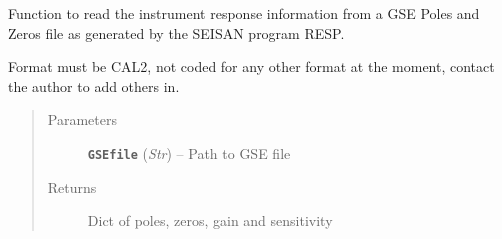 \documentclass[a4paper,10pt,english]{sphinxmanual}
\begin{document}

\begin{fulllineitems}
\label{submodules/utils.mag_calc:mag_calc._GSE2_PAZ_read}
Function to read the instrument response information from a GSE Poles and
Zeros file as generated by the SEISAN program RESP.

Format must be CAL2, not coded for any other format at the moment, contact
the author to add others in.
\begin{quote}\begin{description}
\item[{Parameters}] \leavevmode
\textbf{\texttt{GSEfile}} (\emph{Str}) -- Path to GSE file

\item[{Returns}] \leavevmode
Dict of poles, zeros, gain and sensitivity

\end{description}\end{quote}

\end{fulllineitems}

\end{document}
